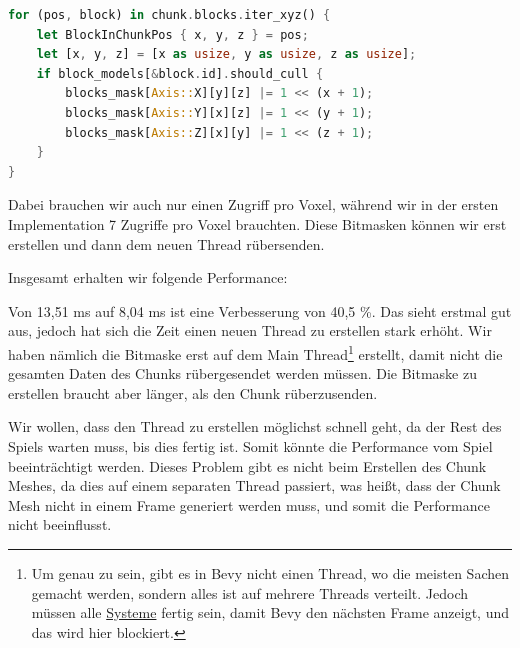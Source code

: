 \begin{lstlisting}[language=Rust]
for (pos, block) in chunk.blocks.iter_xyz() {
	let BlockInChunkPos { x, y, z } = pos;
	let [x, y, z] = [x as usize, y as usize, z as usize];
	if block_models[&block.id].should_cull {
		blocks_mask[Axis::X][y][z] |= 1 << (x + 1);
		blocks_mask[Axis::Y][x][z] |= 1 << (y + 1);
		blocks_mask[Axis::Z][x][y] |= 1 << (z + 1);
	}
}
\end{lstlisting}

Dabei brauchen wir auch nur einen Zugriff pro Voxel,
während wir in der ersten Implementation 7 Zugriffe
pro Voxel brauchten.
Diese Bitmasken können wir erst erstellen und
dann dem neuen Thread rübersenden.


Insgesamt erhalten wir folgende Performance:

\vspace{0.3cm}


\vspace{0.3cm}

Von 13,51 ms auf 8,04 ms ist eine Verbesserung
von 40,5 \%. Das sieht erstmal gut aus,
jedoch hat sich die Zeit einen neuen Thread zu
erstellen stark erhöht. Wir haben nämlich die Bitmaske
erst auf dem Main Thread\footnote{
	Um genau zu sein, gibt es in Bevy
	nicht einen  Thread, wo die meisten Sachen
	gemacht werden, sondern alles ist auf mehrere Threads
	verteilt. Jedoch müssen alle
	\href{https://bevy-cheatbook.github.io/programming/systems.html}{Systeme}
	\cite{bevy_systems} fertig sein, damit Bevy den
	nächsten Frame anzeigt, und das wird hier blockiert.
}
erstellt, damit nicht die
gesamten Daten des Chunks rübergesendet werden müssen.
Die Bitmaske zu erstellen braucht aber länger,
als den Chunk rüberzusenden.

Wir wollen, dass den Thread zu erstellen möglichst
schnell geht, da der Rest des Spiels warten muss,
bis dies fertig ist. Somit könnte die Performance
vom Spiel beeinträchtigt werden. Dieses Problem gibt
es nicht beim Erstellen des Chunk Meshes, da dies auf
einem separaten Thread passiert, was heißt, dass der
Chunk Mesh nicht in einem Frame generiert werden muss,
und somit die Performance nicht beeinflusst.

